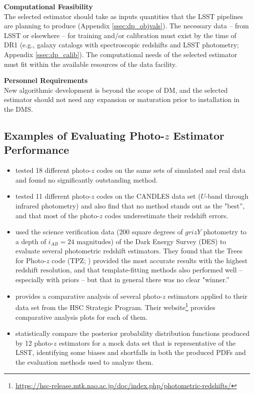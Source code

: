 \documentclass[DM,lsstdraft,toc]{lsstdoc}
\begin{document}
{\bf Computational Feasibility}\\
The selected estimator should take as inputs quantities that the LSST pipelines are planning to produce (Appendix \ref{ssec:dp_objvals}).
The necessary data -- from LSST or elsewhere -- for training and/or calibration must exist by the time of DR1 (e.g., galaxy catalogs with spectroscopic redshifts and LSST photometry; Appendix \ref{ssec:dp_calib}).
The computational needs of the selected estimator must fit within the available resources of the data facility.

{\bf Personnel Requirements}\\
New algorithmic development is beyond the scope of DM, and the selected estimator should not need any expansion or maturation prior to installation in the DMS.


\subsection{Examples of Evaluating Photo-$z$ Estimator Performance}\label{ssec:sel_eval}

\begin{itemize}
\item \citet{2010A&A...523A..31H} tested 18 different photo-$z$ codes on the same sets of simulated and real data and found no significantly outstanding method.
\item \citet{2013ApJ...775...93D} tested 11 different photo-$z$ codes on the CANDLES data set ($U$-band through infrared photometry) and also find that no method stands out as the "best'', and that most of the photo-$z$ codes underestimate their redshift errors.
\item \citet{2014MNRAS.445.1482S} used the science verification data (200 square degrees of $grizY$ photometry to a depth of $i_{AB}=24$ magnitudes) of the Dark Energy Survey (DES) to evaluate several photometric redshift estimators. They found that the Trees for Photo-$z$ code (TPZ; \citet{2013ascl.soft04011C}) provided the most accurate results with the highest redshift resolution, and that template-fitting methods also performed well -- especially with priors -- but that in general there was no clear "winner.''
\item \citet{2018PASJ...70S...9T} provides a comparative analysis of several photo-$z$ estimators applied to their data set from the HSC Strategic Program. Their website\footnote{\url{https://hsc-release.mtk.nao.ac.jp/doc/index.php/photometric-redshifts/}} provides comparative analysis plots for each of them.
\item \citet{2020arXiv200103621S} statistically compare the posterior probability distribution functions produced by 12 photo-$z$ estimators for a mock data set that is representative of the LSST, identifying some biases and shortfalls in both the produced PDFs and the evaluation methods used to analyze them.
\end{itemize}
\end{document}
